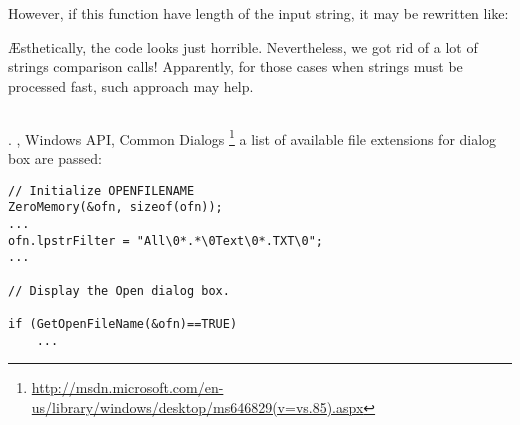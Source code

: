 {However, if this function have length of the input string, it may be rewritten like}:



{\AE{}sthetically, the code looks just horrible}.
{Nevertheless, we got rid of a lot of strings comparison calls}! 
{Apparently, for those cases when strings must be processed fast, such approach may help}.





\subsection{}

.
, \InENRU Windows API,  Common Dialogs
\footnote{\url{http://msdn.microsoft.com/en-us/library/windows/desktop/ms646829(v=vs.85).aspx}} 
{a list of available file extensions for dialog box are passed}:

\begin{lstlisting}
// Initialize OPENFILENAME
ZeroMemory(&ofn, sizeof(ofn));
...
ofn.lpstrFilter = "All\0*.*\0Text\0*.TXT\0";
...

// Display the Open dialog box. 

if (GetOpenFileName(&ofn)==TRUE) 
	...
\end{lstlisting}

